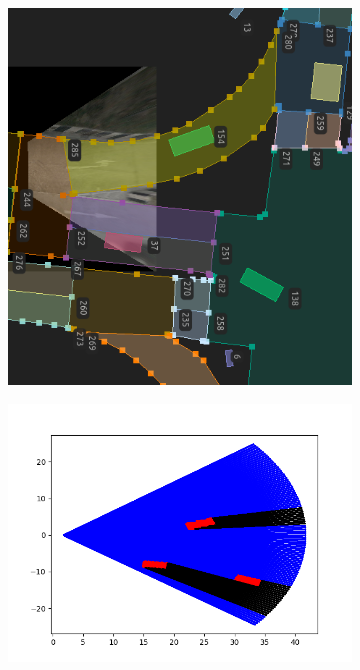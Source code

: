 \begin{figure}[htbp]
    \centering
    \begin{subfigure}[b]{0.3\textwidth}
        \includegraphics[width=\textwidth, height=\textwidth]{images/methodology/gt_occ2_maks/WebLABEL_bev_8.png} 
        \caption{}
        \label{fig:gt_occ2_masks_a}
    \end{subfigure}
    \hfill
    \begin{subfigure}[b]{0.3\textwidth}
        \includegraphics[width=\textwidth, height=\textwidth]{images/methodology/gt_occ2_maks/gt_vec_mask_8.png}

\end{subfigure}
\end{figure}
